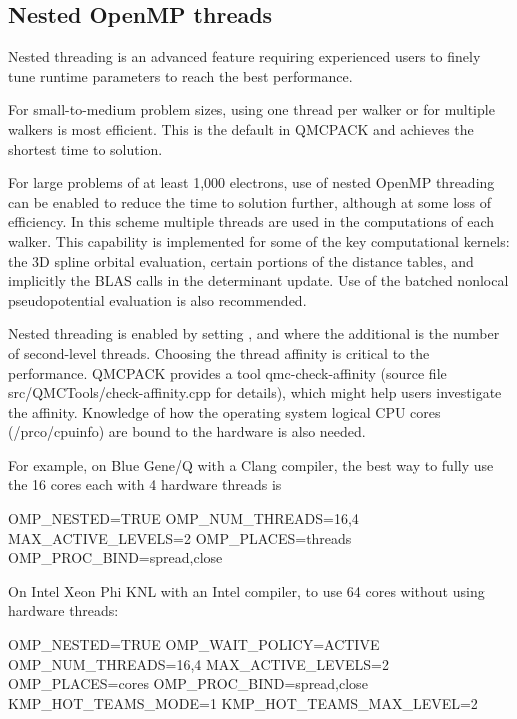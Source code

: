 \subsection{Nested OpenMP threads}
Nested threading is an advanced feature requiring experienced users to finely tune runtime parameters to reach the best performance.  

For small-to-medium problem sizes, using one thread per walker or for multiple walkers is most efficient. This is the default in QMCPACK and achieves the shortest time to solution.

For large problems of at least 1,000 electrons, use of nested OpenMP threading can be enabled to reduce the time to solution further, although at some loss of efficiency. In this scheme multiple threads are used in the computations of each walker. This capability is implemented for some of the key computational kernels: the 3D spline orbital evaluation, certain portions of the distance tables, and implicitly the BLAS calls in the determinant update. Use of the batched nonlocal pseudopotential evaluation is also recommended.

Nested threading is enabled by setting ,  and  where the additional  is the number of second-level threads.  Choosing the thread affinity is critical to the performance.  QMCPACK provides a tool qmc-check-affinity (source file src/QMCTools/check-affinity.cpp for details), which might help users investigate the affinity. Knowledge of how the operating system logical CPU cores (/prco/cpuinfo) are bound to the hardware is also needed.

For example, on Blue Gene/Q with a Clang compiler, the best way to fully use the 16 cores each with 4 hardware threads is
\begin{shade}
OMP_NESTED=TRUE
OMP_NUM_THREADS=16,4
MAX_ACTIVE_LEVELS=2
OMP_PLACES=threads
OMP_PROC_BIND=spread,close
\end{shade}

On Intel Xeon Phi KNL with an Intel compiler, to use 64 cores without using hardware threads:
\begin{shade}
OMP_NESTED=TRUE
OMP_WAIT_POLICY=ACTIVE
OMP_NUM_THREADS=16,4
MAX_ACTIVE_LEVELS=2
OMP_PLACES=cores
OMP_PROC_BIND=spread,close
KMP_HOT_TEAMS_MODE=1
KMP_HOT_TEAMS_MAX_LEVEL=2
\end{shade}

